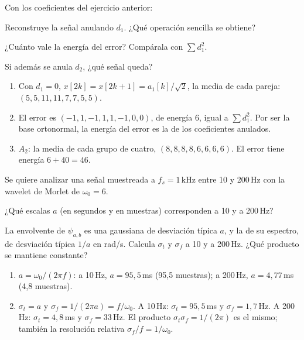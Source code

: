 \documentclass[11pt,a4paper]{scrartcl}
\begin{document}
\begin{ejercicio}
  Con los coeficientes del ejercicio anterior:
  \begin{incisos}[1]
    \item Reconstruye la señal anulando $d_1$. ¿Qué operación sencilla se obtiene?
    \item ¿Cuánto vale la energía del error? Compárala con $\sum d_1^2$.
    \item Si además se anula $d_2$, ¿qué señal queda?
  \end{incisos}
\end{ejercicio}
\begin{solucion}
  \begin{enumerate}[label=\alph*)]
    \item Con $d_1=0$, $x[2k]=x[2k+1]=a_1[k]/\sqrt2$, la media de cada pareja: $(5,5,11,11,7,7,5,5)$.
    \item El error es $(-1,1,-1,1,1,-1,0,0)$, de energía 6, igual a $\sum d_1^2$. Por ser la base ortonormal, la energía del error es la de los coeficientes anulados.
    \item $A_2$: la media de cada grupo de cuatro, $(8,8,8,8,6,6,6,6)$. El error tiene energía $6+40=46$.
  \end{enumerate}
\end{solucion}

\begin{ejercicio}
  Se quiere analizar una señal muestreada a $f_s=1$\,kHz entre 10 y 200\,Hz con la wavelet de Morlet de $\omega_0=6$.
  \begin{incisos}[1]
    \item ¿Qué escalas $a$ (en segundos y en muestras) corresponden a 10 y a 200\,Hz?
    \item La envolvente de $\psi_{a,b}$ es una gaussiana de desviación típica $a$, y la de su espectro, de desviación típica $1/a$ en rad/s. Calcula $\sigma_t$ y $\sigma_f$ a 10 y a 200\,Hz. ¿Qué producto se mantiene constante?
  \end{incisos}
\end{ejercicio}
\begin{solucion}
  \begin{enumerate}[label=\alph*)]
    \item $a=\omega_0/(2\pi f)$: a 10\,Hz, $a=95{,}5$\,ms (95,5 muestras); a 200\,Hz, $a=4{,}77$\,ms (4,8 muestras).
    \item $\sigma_t=a$ y $\sigma_f=1/(2\pi a)=f/\omega_0$. A 10\,Hz: $\sigma_t=95{,}5$\,ms y $\sigma_f=1{,}7$\,Hz. A 200\,Hz: $\sigma_t=4{,}8$\,ms y $\sigma_f=33$\,Hz. El producto $\sigma_t\sigma_f=1/(2\pi)$ es el mismo; también la resolución relativa $\sigma_f/f=1/\omega_0$.
  \end{enumerate}
\end{solucion}
\end{document}
